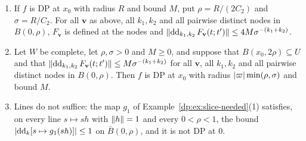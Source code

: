 \begin{theorem}[planes]\label{dp:thm:divided-planes}
\leavevmode
\begin{enumerate}
\item If $f$ is DP at $x_0$ with radius $R$ and bound $M$, put $\rho=R/(2C_2)$ and $\sigma=R/C_2$. For all $\mathbf v$ as above, all $k_1,k_2$ and all pairwise distinct nodes in $B(0,\rho)$, $F_{\mathbf v}$ is defined at the nodes and $\lVert \operatorname{dd}_{k_1,k_2}F_{\mathbf v}(t;t')\rVert\le4M\sigma^{-(k_1+k_2)}$.
\item Let $W$ be complete, let $\rho,\sigma>0$ and $M\ge0$, and suppose that $B(x_0,2\rho)\subseteq U$ and that $\lVert \operatorname{dd}_{k_1,k_2}F_{\mathbf v}(t;t')\rVert\le M\sigma^{-(k_1+k_2)}$ for all $\mathbf v$, all $k_1,k_2$ and all pairwise distinct nodes in $B(0,\rho)$. Then $f$ is DP at $x_0$ with radius $\lvert \varpi\rvert\min(\rho,\sigma)$ and bound $M$.
\item Lines do not suffice: the map $g_1$ of Example~\textup{\ref{dp:ex:slice-needed}(1)} satisfies, on every line $s\mapsto sh$ with $\lVert h\rVert=1$ and every $0<\rho<1$, the bound $\lvert \operatorname{dd}_k[s\mapsto g_1(sh)]\rvert\le1$ on $\bar B(0,\rho)$, and it is not DP at $0$.
\end{enumerate}
\end{theorem}


